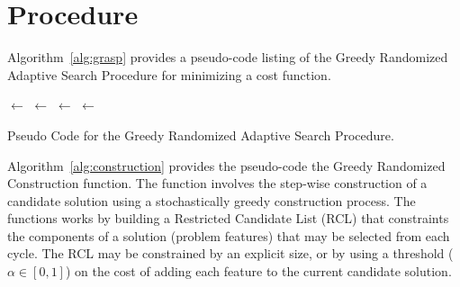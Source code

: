 \documentclass[a4paper, 11pt]{article}
\begin{document}
\section{Procedure}
\label{sec:procedure}
Algorithm~\ref{alg:grasp} provides a pseudo-code listing of the Greedy Randomized Adaptive Search Procedure for minimizing a cost function.

\begin{algorithm}[ht]
	\SetLine
	\KwIn{\Alpha}
	\KwOut{\Best}
	\Best $\leftarrow$ \ConstructRandomSolution{}\;
	\While{$\neg$ \StopCondition{}} {
		\Candidate $\leftarrow$ \GreedyRandomizedConstruction{\Alpha}\;
		\Candidate $\leftarrow$ \LocalSearch{\Candidate}\;
		\If{\Cost{\Candidate} $<$ \Cost{\Best}} {
			\Best $\leftarrow$ \Candidate\;
		}
	}
	\Return{\Best}\;
	\caption{Pseudo Code for the Greedy Randomized Adaptive Search Procedure.}
	\label{alg:grasp}
\end{algorithm}

Algorithm~\ref{alg:construction} provides the pseudo-code the Greedy Randomized Construction function. The function involves the step-wise construction of a candidate solution using a stochastically greedy construction process. The functions works by building a Restricted Candidate List (RCL) that constraints the components of a solution (problem features) that may be selected from each cycle. The RCL may be constrained by an explicit size, or by using a threshold ($\alpha \in [0,1]$) on the cost of adding each feature to the current candidate solution.
\end{document}
